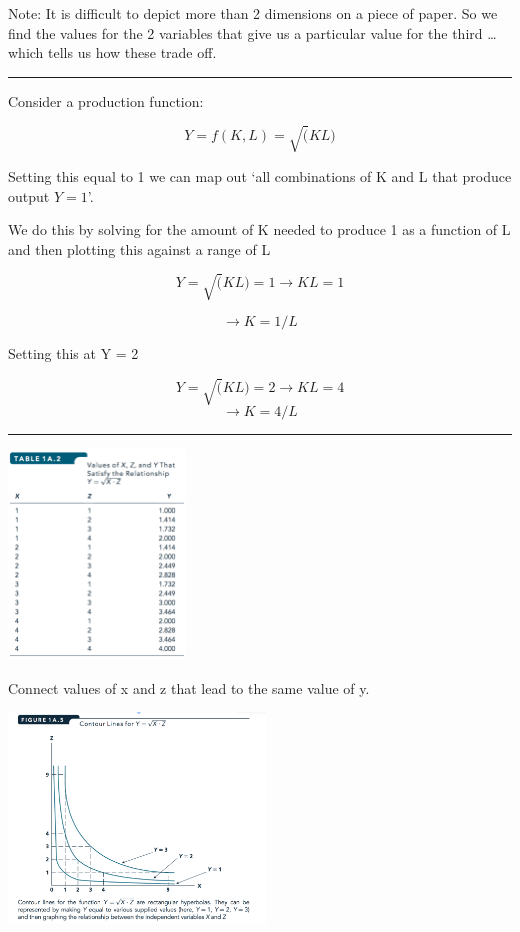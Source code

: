 \documentclass[]{article}
\begin{document}
Note: It is difficult to depict more than 2 dimensions on a piece of
paper. So we find the values for the 2 variables that give us a
particular value for the third \ldots{} which tells us how these trade
off.

\begin{center}\rule{0.5\linewidth}{\linethickness}\end{center}

Consider a production function:

\[Y = f(K,L) = \sqrt(KL)\]

\bigskip

Setting this equal to 1 we can map out `all combinations of K and L that
produce output \(Y=1\)'.

We do this by solving for the amount of K needed to produce 1 as a
function of L and then plotting this against a range of L

\bigskip

\[  Y = \sqrt(KL) = 1 \rightarrow KL = 1 \]

\bigskip

\[ \rightarrow K = 1/L \]

\bigskip

Setting this at Y = 2

\[  Y = \sqrt(KL) = 2 \rightarrow KL = 4 \] \[ \rightarrow K = 4/L \]

\begin{center}\rule{0.5\linewidth}{\linethickness}\end{center}

\includegraphics[height=2.2in]{picsfigs/contourcombos.png}

Connect values of x and z that lead to the same value of y.

\includegraphics[height=2.2in]{picsfigs/contourlines_example.png}
\end{document}
